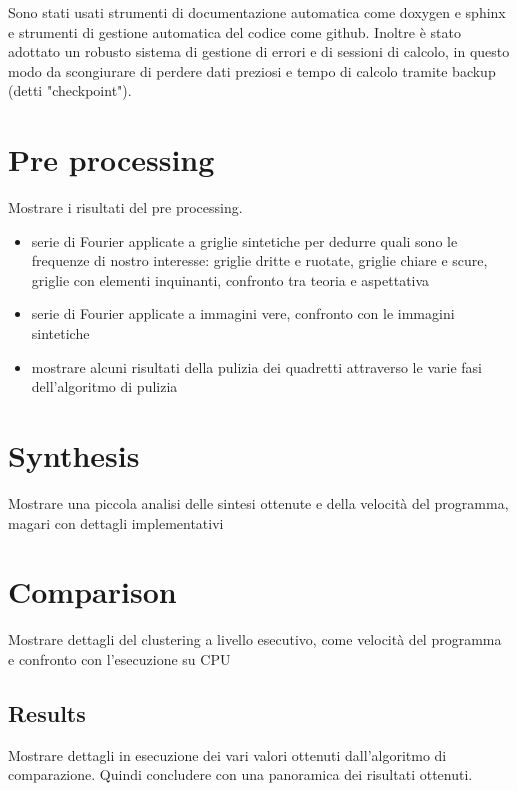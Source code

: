 \begin{toDo}
	\noindent Sono stati usati strumenti di documentazione automatica come \gls{doxygen} e \gls{sphinx} e strumenti di gestione automatica del codice come \gls{github}. Inoltre è stato adottato un robusto sistema di gestione di errori e di sessioni di calcolo, in questo modo da scongiurare di perdere dati preziosi e tempo di calcolo tramite backup (detti "checkpoint").

    \section{Pre processing}
    Mostrare i risultati del pre processing.
    \begin{itemize}
        \item serie di Fourier applicate a griglie sintetiche per dedurre quali sono le frequenze di nostro interesse: griglie dritte e ruotate, griglie chiare e scure, griglie con elementi inquinanti, confronto tra teoria e aspettativa
        \item serie di Fourier applicate a immagini vere, confronto con le immagini sintetiche
        \item mostrare alcuni risultati della pulizia dei quadretti attraverso le varie fasi dell'algoritmo di pulizia
    \end{itemize}
    \section{Synthesis}
    Mostrare una piccola analisi delle sintesi ottenute e della velocità del programma, magari con dettagli implementativi
    \section{Comparison}
   		Mostrare dettagli del clustering a livello esecutivo, come velocità del programma e confronto con l'esecuzione su CPU
    	\subsection{Results}
    		Mostrare dettagli in esecuzione dei vari valori ottenuti dall'algoritmo di comparazione. Quindi concludere con una panoramica dei risultati ottenuti.
\end{toDo}


